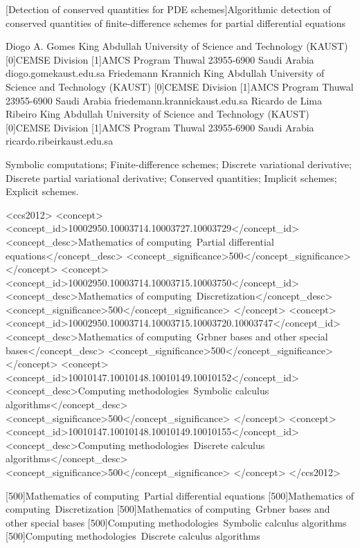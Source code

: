 \documentclass{article}
\begin{document}
[Detection of conserved quantities for PDE schemes]{Algorithmic detection of conserved quantities of finite-difference schemes for partial differential equations}

{Diogo A. Gomes}
{
	{King Abdullah University of Science and Technology (KAUST)}
	[0]{CEMSE Division}
	[1]{AMCS Program}
	{Thuwal}
	{23955-6900}
	{Saudi Arabia}}
{diogo.gomekaust.edu.sa}
{Friedemann Krannich}
{
	{King Abdullah University of Science and Technology (KAUST)}
	[0]{CEMSE Division}
	[1]{AMCS Program}
	{Thuwal}
	{23955-6900}
	{Saudi Arabia}}
{friedemann.krannickaust.edu.sa}
{Ricardo de Lima Ribeiro}
{
	{King Abdullah University of Science and Technology (KAUST)}
	[0]{CEMSE Division}
	[1]{AMCS Program}
	{Thuwal}
	{23955-6900}
	{Saudi Arabia}}
{ricardo.ribeirkaust.edu.sa}


{Symbolic computations; Finite-difference schemes; Discrete variational derivative; Discrete partial variational derivative; Conserved quantities; Implicit schemes; Explicit schemes.}


	<ccs2012>
	<concept>
	<concept_id>10002950.10003714.10003727.10003729</concept_id>
	<concept_desc>Mathematics of computing~Partial differential equations</concept_desc>
	<concept_significance>500</concept_significance>
	</concept>
	<concept>
	<concept_id>10002950.10003714.10003715.10003750</concept_id>
	<concept_desc>Mathematics of computing~Discretization</concept_desc>
	<concept_significance>500</concept_significance>
	</concept>
	<concept>
	<concept_id>10002950.10003714.10003715.10003720.10003747</concept_id>
	<concept_desc>Mathematics of computing~Gr{}bner bases and other special bases</concept_desc>
	<concept_significance>500</concept_significance>
	</concept>
	<concept>
	<concept_id>10010147.10010148.10010149.10010152</concept_id>
	<concept_desc>Computing methodologies~Symbolic calculus algorithms</concept_desc>
	<concept_significance>500</concept_significance>
	</concept>
	<concept>
	<concept_id>10010147.10010148.10010149.10010155</concept_id>
	<concept_desc>Computing methodologies~Discrete calculus algorithms</concept_desc>
	<concept_significance>500</concept_significance>
	</concept>
	</ccs2012>


[500]{Mathematics of computing~Partial differential equations}
[500]{Mathematics of computing~Discretization}
[500]{Mathematics of computing~Gr{}bner bases and other special bases}
[500]{Computing methodologies~Symbolic calculus algorithms}
[500]{Computing methodologies~Discrete calculus algorithms}

{}
\end{document}
